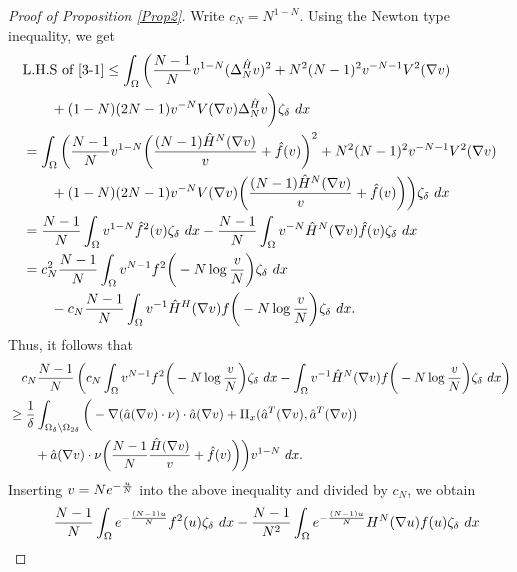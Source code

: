 \documentclass[10pt,a4paper]{amsart}
\numberwithin{equation}{section}
\newcommand{\e}{\textup{e}}
\newcommand{\dx}{\textup{d}x}
\begin{document}
\begin{proof}[Proof of Proposition \ref{Prop2}]
    Write $c_N = N^{1-N}$. Using the Newton type inequality, we get
    \begin{align*}
        & \text{L.H.S of \eqref{3-1}}  \leq \int_{\Omega} \bigg( \frac{N-1}{N} v^{1-N} (\Delta_N^{\hat{H}} v)^2 +  N^2(N-1)^2 v^{-N-1} V^2(\nabla v) \\
        &\qquad + (1-N)(2N-1)v^{-N} V(\nabla v) \Delta_N^{\hat{H}} v \bigg) \zeta_{\delta} \ \dx\\
        & = \int_{\Omega} \bigg( \frac{N-1}{N} v^{1-N} \bigg( \frac{(N-1)\hat{H}^N(\nabla v)}{v} + \hat{f}(v) \bigg)^2 +  N^2(N-1)^2 v^{-N-1} V^2(\nabla v) \\
        & \qquad + (1- N)(2N-1)v^{-N} V(\nabla v) \bigg(\frac{(N-1)\hat{H}^N(\nabla v)}{v} + \hat{f}(v)\bigg) \bigg) \zeta_{\delta} \ dx\\
        & = \frac{N-1}{N} \int_{\Omega} v^{1-N} \hat{f}^2(v) \zeta_{\delta} \ \dx - \frac{N-1}{N} \int_{\Omega}v^{-N} \hat{H}^{N}(\nabla v) \hat{f}(v) \zeta_{\delta} \ \dx \\
        & = c_N^2 \frac{N-1}{N} \int_{\Omega} v^{N-1} f^2\bigg( - N \log \frac{v}{N} \bigg) \zeta_{\delta} \ \dx \\
        & \qquad - c_N \frac{N-1}{N} \int_{\Omega} v^{-1} \hat{H}^{H}(\nabla v) f\bigg( - N \log \frac{v}{N} \bigg) \zeta_{\delta} \ \dx.
    \end{align*}
    Thus, it follows that
    \begin{align*}
        &\quad c_N \frac{N-1}{N} \left( c_N\int_{\Omega} v^{N-1} f^2\bigg( - N \log \frac{v}{N} \bigg) \zeta_{\delta} \ \dx - \int_{\Omega} v^{-1} \hat{H}^{N}(\nabla v) f\bigg( - N \log \frac{v}{N} \bigg) \zeta_{\delta} \ \dx \right) \\
        & \geq \frac{1}{\delta} \int_{\Omega_{\delta} \backslash \Omega_{2 \delta}} \bigg( - \nabla(\hat{a}(\nabla v) \cdot \nu) \cdot \hat{a}(\nabla v) + \Pi _x(\hat{a}^T(\nabla v), \hat{a}^T(\nabla v)) \\
        & \qquad + \hat{a}(\nabla v)\cdot \nu \bigg( \frac{N-1}{N} \frac{\hat{H}(\nabla v)}{v} + \hat{f}(v)\bigg)\bigg) v^{1-N} \ \dx.
    \end{align*}
    Inserting $v = N \e^{-\frac{u}{N}}$ into the above inequality and divided by $c_N$, we obtain
    \begin{align}
        & \quad \frac{N-1}{N} \int_{\Omega} \e^{-\frac{(N-1)u}{N}} f^2(u) \zeta_{\delta} \ \dx - \frac{N-1}{N^2} \int_{\Omega} e^{-\frac{(N-1)u}{N}} H^{N}(\nabla u) f(u) \zeta_{\delta} \ \dx \nonumber \\

\end{align}
\end{proof}
\end{document}
